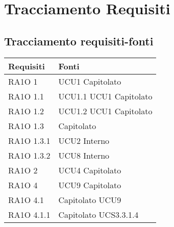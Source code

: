 \section{Tracciamento Requisiti}
\subsection{Tracciamento requisiti-fonti}
      \begin{center}
      \bgroup
      \def\arraystretch{1.8}
      \begin{longtable}{ | p{5cm} | p{5cm} |}
    
      \cellcolor[gray]{0.9} \textbf{Requisiti} & \cellcolor[gray]{0.9} \textbf{Fonti} \\ \hline       
        RA1O 1 &  UCU1 \newline  Capitolato \newline  \\ \hline      
        RA1O 1.1 &  UCU1.1 \newline  UCU1 \newline  Capitolato \newline  \\ \hline      
        RA1O 1.2 &  UCU1.2 \newline  UCU1 \newline  Capitolato \newline  \\ \hline      
        RA1O 1.3  &  Capitolato \newline  \\ \hline      
        RA1O 1.3.1 &  UCU2 \newline  Interno \newline  \\ \hline      
        RA1O 1.3.2 &  UCU8 \newline  Interno \newline  \\ \hline      
        RA1O 2  &  UCU4 \newline  Capitolato \newline  \\ \hline      
        RA1O 4 &  UCU9 \newline  Capitolato \newline  \\ \hline      
        RA1O 4.1  &  Capitolato \newline  UCU9 \newline  \\ \hline      
        RA1O 4.1.1  &  Capitolato \newline  UCS3.3.1.4 \newline  \\ \hline      

\end{longtable}
\end{center}
